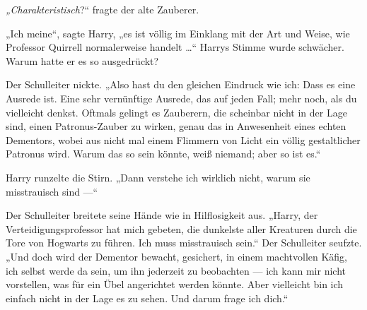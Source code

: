 \emph{„Charakteristisch}?“ fragte der alte Zauberer.

„Ich meine“, sagte Harry, „es ist völlig im Einklang mit der Art und Weise, wie Professor Quirrell normalerweise handelt …“ Harrys Stimme wurde schwächer. Warum hatte er es so ausgedrückt?

Der Schulleiter nickte.
„Also hast du den gleichen Eindruck wie ich: Dass es eine Ausrede ist. Eine sehr vernünftige Ausrede, das auf jeden Fall; mehr noch, als du vielleicht denkst. Oftmals gelingt es Zauberern, die scheinbar nicht in der Lage sind, einen Patronus-Zauber zu wirken, genau das in Anwesenheit eines echten Dementors, wobei aus nicht mal einem Flimmern von Licht ein völlig gestaltlicher Patronus wird. Warum das so sein könnte, weiß niemand; aber so ist es.“

Harry runzelte die Stirn.
„Dann verstehe ich wirklich nicht, warum sie misstrauisch sind —“

Der Schulleiter breitete seine Hände wie in Hilflosigkeit aus.
„Harry, der Verteidigungsprofessor hat mich gebeten, die dunkelste aller Kreaturen durch die Tore von Hogwarts zu führen. Ich muss misstrauisch sein.“ Der Schulleiter seufzte.
„Und doch wird der Dementor bewacht, gesichert, in einem machtvollen Käfig, ich selbst werde da sein, um ihn jederzeit zu beobachten — ich kann mir nicht vorstellen, was für ein Übel angerichtet werden könnte. Aber vielleicht bin ich einfach nicht in der Lage es zu sehen. Und darum frage ich dich.“


